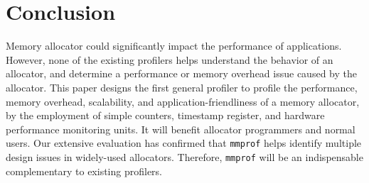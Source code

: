 \section{Conclusion}
\label{sec:conclusion}

Memory allocator could significantly impact the performance of applications. However, none of the existing profilers helps understand the behavior of an allocator, and determine  a performance or memory overhead issue caused by the allocator. This paper designs the first general profiler to profile the performance, memory overhead, scalability, and application-friendliness of a memory allocator, by the employment of simple counters, timestamp register, and hardware performance monitoring units. It will benefit allocator programmers and normal users. Our extensive evaluation has confirmed that \texttt{mmprof} helps identify multiple design issues in widely-used allocators. Therefore, \texttt{mmprof} will be an indispensable complementary to existing profilers. 
